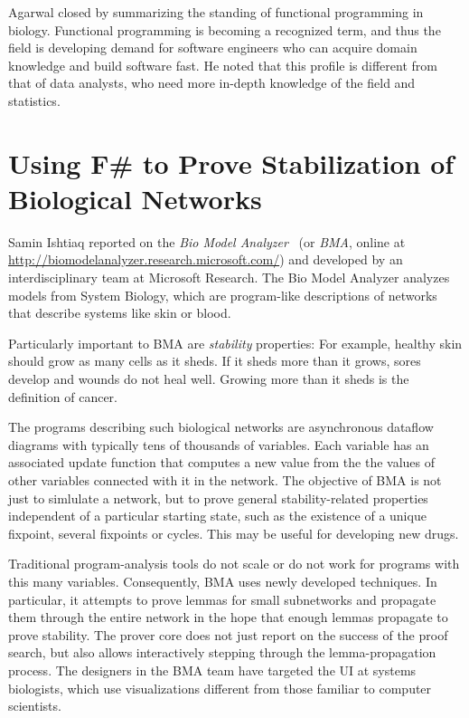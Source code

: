 \documentclass{jfp1}
\begin{document}
Agarwal closed by summarizing the standing of functional programming
in biology. Functional programming is becoming a recognized term, and
thus the field is developing demand for software engineers who can
acquire domain knowledge and build software fast.  He noted that this
profile is different from that of data analysts, who need more
in-depth knowledge of the field and statistics.

\section{Using F\# to Prove Stabilization of Biological Networks}

Samin Ishtiaq reported on the \textit{Bio Model
  Analyzer}~\cite{Benque:2012:BVT:2362216.2362280} (or \textit{BMA},
online at \url{http://biomodelanalyzer.research.microsoft.com/}) and
developed by an interdisciplinary team at Microsoft Research. The Bio
Model Analyzer analyzes models from System Biology, which are
program-like descriptions of networks that describe systems like skin
or blood.

Particularly important to BMA are \textit{stability} properties: For
example, healthy skin should grow as many cells as it sheds.  If it
sheds more than it grows, sores develop and wounds do not heal well.
Growing more than it sheds is the definition of cancer.

The programs describing such biological networks are asynchronous
dataflow diagrams with typically tens of thousands of variables.  Each
variable has an associated update function that computes a new value
from the the values of other variables connected with it in the
network.  The objective of BMA is not just to simlulate a network, but
to prove general stability-related properties independent of a
particular starting state, such as the existence of a unique fixpoint,
several fixpoints or cycles.  This may be useful for developing new
drugs.

Traditional program-analysis tools do not scale or do not work for
programs with this many variables.  Consequently, BMA uses newly
developed techniques.  In particular, it attempts to prove lemmas for small
subnetworks and propagate them through the entire network in the hope
that enough lemmas propagate to prove stability.  The prover core does
not just report on the success of the proof search, but also allows
interactively stepping through the lemma-propagation process.  The
designers in the BMA team have targeted the UI at systems biologists,
which use visualizations different from those familiar to computer scientists.
\end{document}
